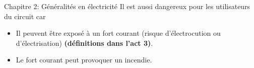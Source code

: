 \documentclass[24pt]{article}
\newcommand{\titre}{Chapitre 2: Généralités en électricité} %
\begin{document}
\begin{titlebox}{\titre}
    Il est aussi dangereux pour les utilisateurs du circuit car 
    
    \begin{itemize}
        \item Il peuvent être exposé à un fort courant 
        (risque d'électrocution ou d'électrisation) 
        \textbf{\color{DarkRed} {(définitions dans l'act 3)}}.
        \item Le fort courant peut provoquer un incendie.
    \end{itemize}

\end{titlebox}
\end{document}
